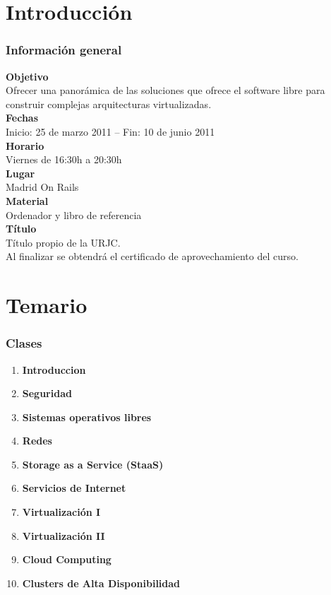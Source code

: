 \documentclass{beamer}
\begin{document}
\section{Introducción}

\begin{frame}
\frametitle{Información general}
\textbf{Objetivo}\\
Ofrecer una panorámica de las soluciones que ofrece el software libre para construir complejas arquitecturas virtualizadas.\\
\textbf{Fechas}\\
Inicio: 25 de marzo 2011 -- Fin: 10 de junio 2011\\
\textbf{Horario}\\
Viernes de 16:30h a 20:30h\\
\textbf{Lugar}\\
Madrid On Rails\\
\textbf{Material}\\
Ordenador y libro de referencia\\
\textbf{Título}\\
Título propio de la URJC.\\
Al finalizar se obtendrá el certificado de aprovechamiento del curso.
\end{frame}

\section{Temario}
\begin{frame}
\frametitle{Clases}
\begin{enumerate}
\item \textbf{Introduccion}
\item \textbf{Seguridad}
\item \textbf{Sistemas operativos libres}
\item \textbf{Redes}
\item \textbf{Storage as a Service (StaaS)}
\item \textbf{Servicios de Internet}
\item \textbf{Virtualización I}
\item \textbf{Virtualización II}
\item \textbf{Cloud Computing}
\item \textbf{Clusters de Alta Disponibilidad}
\end{enumerate}
\end{frame}
\end{document}
